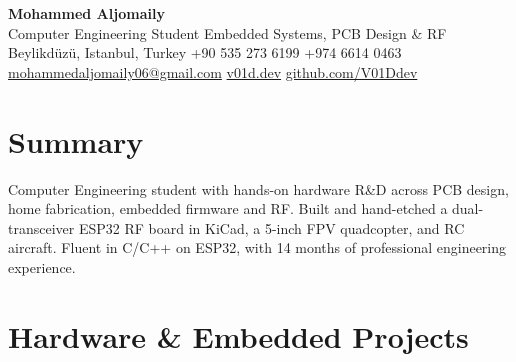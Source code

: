 \documentclass[10pt,a4paper]{article}
\begin{document}
\begin{center}
    {\LARGE \textbf{Mohammed Aljomaily}}\\[5pt]
    Computer Engineering Student \textbar{} Embedded Systems, PCB Design \& RF\\[5pt]
    Beylikd\"uz\"u, Istanbul, Turkey \textbar{} +90 535 273 6199 \textbar{} +974 6614 0463\\[3pt]
    \href{mailto:mohammedaljomaily06@gmail.com}{mohammedaljomaily06@gmail.com} \textbar{} \href{https://v01d.dev}{v01d.dev} \textbar{} \href{https://github.com/V01Ddev}{github.com/V01Ddev}
\end{center}

\section*{Summary}
Computer Engineering student with hands-on hardware R\&D across PCB design, home
fabrication, embedded firmware and RF. Built and hand-etched a dual-transceiver
ESP32 RF board in KiCad, a 5-inch FPV quadcopter, and RC aircraft. Fluent in
C/C++ on ESP32, with 14 months of professional engineering experience.

\section*{Hardware \& Embedded Projects}
\end{document}
